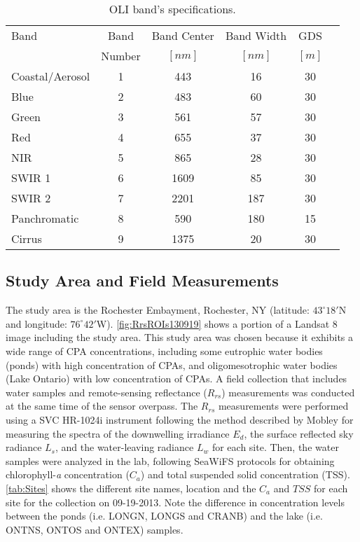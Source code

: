 \documentclass[draft]{spie}  %
\begin{document}
\begin{table}[!ht]
\caption{ OLI band's specifications. \label{tab:L8specs} } 
\vspace{0.2cm}
\centering
\begin{tabular}{lccccl} 
 \hline
Band  			&	Band 		& Band Center 	&	Band Width  &	GDS  	\\ 
      			&   Number 	    &	$[nm]$ 		&	$[nm]$		& $[m]$ 	\\ \hline \hline
Coastal/Aerosol & 	1 			&	443  		& 	16 			& 30	 	\\  	
Blue 			& 	2 			&	483  		& 	60 			& 30	 	\\  	
Green 			& 	3 			&	561  		& 	57 			& 30 	 	\\  	
Red 			& 	4 			&	655  		& 	37 			& 30	 	\\  	
NIR 			& 	5 			&	865  		& 	28			& 30	 	\\  	
SWIR 1 			& 	6 			&	1609 		& 	85 			& 30	 	\\  	
SWIR 2 			& 	7 			&	2201 		& 	187 		& 30	 	\\  	
Panchromatic 	&	8 			&	590  		& 	180 		& 15	 	\\  	
Cirrus 			&	9 			&	1375 		& 	20 			& 30	 	\\	\hline
 \end{tabular}	
\end{table}	
\subsection{Study Area and Field Measurements}

The study area is the Rochester Embayment, Rochester, NY (latitude: $43^\circ18'$N and longitude: $76^\circ42'$W). \autoref{fig:RrsROIs130919} shows a portion of a Landsat 8 image including the study area. This study area was chosen because it exhibits a wide range of CPA concentrations, including some eutrophic water bodies (ponds) with high concentration of CPAs, and oligomesotrophic water bodies (Lake Ontario) with low concentration of CPAs. A field collection that includes water samples and remote-sensing reflectance ($R_{rs}$) measurements was conducted at the same time of the sensor overpass. The $R_{rs}$ measurements were performed using a SVC HR-1024i instrument\cite{SVCHR1024i} following the method described by Mobley\cite{Mobley:1999} for measuring the spectra of the downwelling irradiance $E_d$, the surface reflected sky radiance $L_s$, and the water-leaving radiance $L_w$ for each site. Then, the water samples were analyzed in the lab, following SeaWiFS protocols\cite{Mueller1995} for obtaining chlorophyll-{\it a} concentration ($C_a$) and total suspended solid concentration (TSS). \autoref{tab:Sites} shows the different site names, location and the $C_a$ and $TSS$ for each site for the collection on 09-19-2013. Note the difference in concentration levels between the ponds (i.e. LONGN, LONGS and CRANB) and the lake (i.e. ONTNS, ONTOS and ONTEX) samples.
\end{document}
